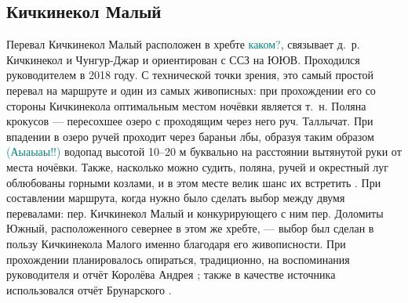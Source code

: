\subsection{Кичкинекол Малый} 
Перевал Кичкинекол Малый расположен в хребте \textcolor{teal}{каком?}, связывает д.~р. Кичкинекол и Чунгур-Джар и ориентирован с ССЗ на ЮЮВ. Проходился руководителем в 2018 году. С технической точки зрения, это самый простой перевал на маршруте и один из самых живописных: при прохождении его со стороны Кичкинекола оптимальным местом ночёвки является т.~н. Поляна крокусов --- пересохшее озеро с проходящим через него руч. Таллычат. При впадении в озеро ручей проходит через бараньи лбы, образуя таким образом \textcolor{teal}{(Аыаыаы!!)} водопад высотой 10--20 м буквально на расстоянии вытянутой руки от места ночёвки. Также, насколько можно судить, поляна, ручей и окрестный луг облюбованы горными козлами, и в этом месте велик шанс их встретить \cite{Korolyov2018}. При составлении маршрута, когда нужно было сделать выбор между двумя перевалами: пер. Кичкинекол Малый и конкурирующего с ним пер. Доломиты Южный, расположенного севернее в этом же хребте, --- выбор был сделан в пользу Кичкинекола Малого именно благодаря его живописности. При прохождении планировалось опираться, традиционно, на воспоминания руководителя и отчёт Королёва Андрея \cite{Korolyov2018}; также в качестве источника использовался отчёт Брунарского \cite{Brunarsky}. 